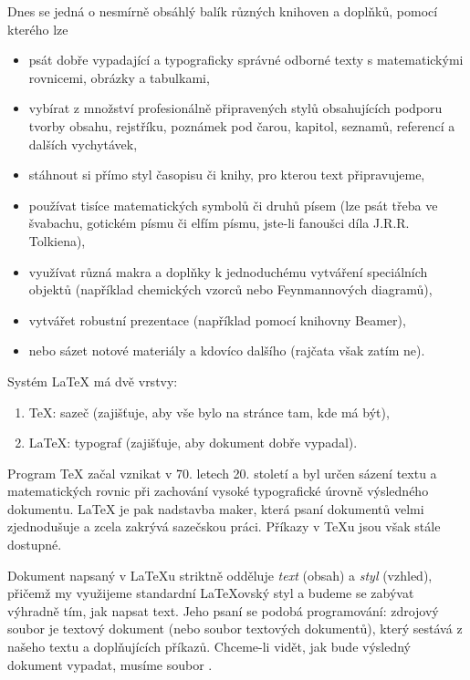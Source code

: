 \documentclass[a4paper,11pt,twoside]{article}
\theoremstyle{red}
\theoremstyle{green}
\begin{document}
    Dnes se jedná o nesmírně obsáhlý balík různých knihoven a doplňků, pomocí kterého lze
    \begin{itemize}
        \item psát dobře vypadající a typograficky správné odborné texty s matematickými rovnicemi, obrázky a tabulkami,
        \item vybírat z množství profesionálně připravených stylů obsahujících podporu tvorby obsahu, rejstříku, poznámek pod čarou, kapitol, seznamů, referencí a dalších vychytávek,
        \item stáhnout si přímo styl časopisu či knihy, pro kterou text připravujeme, 
        \item používat tisíce matematických symbolů či druhů písem (lze psát třeba ve švabachu, gotickém písmu či elfím písmu, jste-li fanoušci díla J.R.R. Tolkiena),
        \item využívat různá makra a doplňky k jednoduchému vytváření speciálních objektů (například chemických vzorců nebo Feynmannových diagramů),
        \item vytvářet robustní prezentace (například pomocí knihovny Beamer),
        \item nebo sázet notové materiály a kdovíco dalšího (rajčata však zatím ne).
    \end{itemize}

    Systém \LaTeX{} má dvě vrstvy:
    \begin{enumerate}
        \item \TeX{}: sazeč (zajišťuje, aby vše bylo na stránce tam, kde má být),
        \item \LaTeX{}: typograf (zajišťuje, aby dokument dobře vypadal).
    \end{enumerate}
    Program \TeX{} začal vznikat v 70. letech 20. století a byl určen sázení textu a matematických rovnic při zachování vysoké typografické úrovně výsledného dokumentu.
    \LaTeX{} je pak nadstavba maker, která psaní dokumentů velmi zjednodušuje a zcela zakrývá sazečskou práci. 
    Příkazy v \TeX{}u jsou však stále dostupné.

    Dokument napsaný v \LaTeX{}u striktně odděluje \emph{text} (obsah) a \emph{styl} (vzhled), přičemž my využijeme standardní \LaTeX{}ovský styl a budeme se zabývat výhradně tím, jak napsat text.
    Jeho psaní se podobá programování: zdrojový soubor je textový dokument (nebo soubor textových dokumentů), který sestává z našeho textu a doplňujících příkazů.
    Chceme-li vidět, jak bude výsledný dokument vypadat, musíme soubor .
\end{document}
